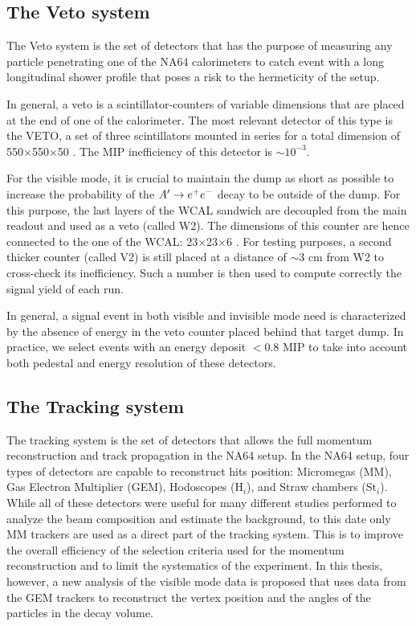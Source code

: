 \subsection{The Veto system}
\label{ch2:sec:detectors-veto}

The Veto system is the set of detectors that has the purpose of measuring any particle penetrating one of the NA64 calorimeters to catch event with a long longitudinal shower profile that poses a risk to the hermeticity of the setup.

In general, a veto is a scintillator-counters of variable dimensions that are placed at the end of one of the calorimeter. The most relevant detector of this type is the VETO, a set of three scintillators mounted in series for a total dimension of 550$\times$550$\times$50 \mmc. The MIP inefficiency of this detector is $\sim 10^{-3}$.

For the visible mode, it is crucial to maintain the dump as short as possible to increase the probability of the $A' \to e^+e^-$ decay to be outside of the dump. For this purpose, the last layers of the WCAL sandwich are decoupled from the main readout and used as a veto (called W2). The dimensions of this counter are hence connected to the one of the WCAL: 23$\times$23$\times$6 \mmc. For testing purposes, a second thicker counter (called V2) is still placed at a distance of $\sim3$ \si{cm} from W2 to cross-check its inefficiency. Such a number is then used to compute correctly the signal yield of each run.

In general, a signal event in both visible and invisible mode need is characterized by the absence of energy in the veto counter placed behind that target dump. In practice, we select events with an energy deposit $<$0.8 MIP to take into account both pedestal and energy resolution of these detectors.

\subsection{The Tracking system}
\label{ch2:sec:detectors-tracking}

The tracking system is the set of detectors that allows the full momentum reconstruction and track propagation in the NA64 setup. In the NA64 setup, four types of detectors are capable to reconstruct hits position: Micromegas (MM), Gas Electron Multiplier (GEM), Hodoscopes (H$_i$), and Straw chambers (St$_i$). While all of these detectors were useful for many different studies performed to analyze the beam composition and estimate the background, to this date only MM trackers are used as a direct part of the tracking system. This is to improve the overall efficiency of the selection criteria used for the momentum reconstruction and to limit the systematics of the experiment. In this thesis, however, a new analysis of the visible mode data is proposed that uses data from the GEM trackers to reconstruct the vertex position and the angles of the particles in the decay volume.

